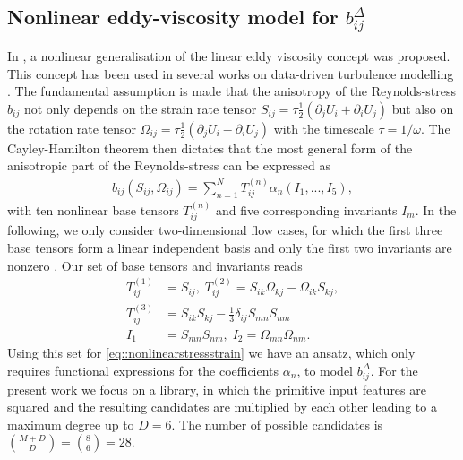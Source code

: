 \documentclass[10pt,a4paper,twoside]{article}
\newcommand{\B}{\bm{\mathcal{B}}}
\newcommand{\bij}{b_{ij}}
\newcommand{\Sij}{S_{ij}}
\newcommand{\Oij}{\Omega_{ij}}
\newcommand{\bdelta}{b^\Delta_{ij}}
\begin{document}
\subsection{Nonlinear eddy-viscosity model for $\bdelta$}
 In \cite{Pope1975}, a nonlinear generalisation of the linear eddy viscosity concept was proposed. This concept has been used in several works on data-driven turbulence modelling \cite{Xiao2019,Duraisamy2019}. The fundamental assumption is made that the anisotropy of the Reynolds-stress $\bij$ not only depends on the strain rate tensor $S_{ij} = \tau \frac{1}{2} (\partial_j U_i + \partial_i U_j)$ but also on the rotation rate tensor $\Omega_{ij}= \tau \frac{1}{2} (\partial_j U_i - \partial_i U_j) $ with the timescale $\tau=1/\omega$. The Cayley-Hamilton theorem then dictates that the most general form of the anisotropic part of the Reynolds-stress can be expressed as
\begin{align}
	\bij(\Sij, \Oij) = \sum_{n=1}^N T_{ij}^{(n)} \alpha_n(I_1, ..., I_5), \label{eq::nonlinearstressstrain}
\end{align}
\noindent with ten nonlinear base tensors $T_{ij}^{(n)}$ and five corresponding invariants $I_m$. In the following, we only consider two-dimensional flow cases, for which the first three base tensors form a linear independent basis  and only the first two invariants are nonzero \cite{Gatski2000}. Our set of base tensors and invariants reads
\begin{align}
	T_{ij}^{(1)} &= S_{ij},\; T_{ij}^{(2)} = S_{ik}\Omega_{kj} - \Omega_{ik}S_{kj}, \nonumber \\
	T_{ij}^{(3)} &= S_{ik}S_{kj} - \frac{1}{3} \delta_{ij} S_{mn}S_{nm}\label{eq:basetensor}\\
	I_1 &= S_{mn}S_{nm},\; I_2 = \Omega_{mn}\Omega_{nm}. \label{eq:invariants}
\end{align}
Using this set for \eqref{eq::nonlinearstressstrain} we have an ansatz, which only requires functional expressions for the coefficients $\alpha_n$, to model $\bdelta$. For the present work we focus on a library, in which the primitive input features are squared and the resulting candidates are multiplied by each other leading to a maximum degree up to $D=6$. The number of possible candidates is $\binom{M+D}{D} = \binom{8}{6} = 28$.
\end{document}
